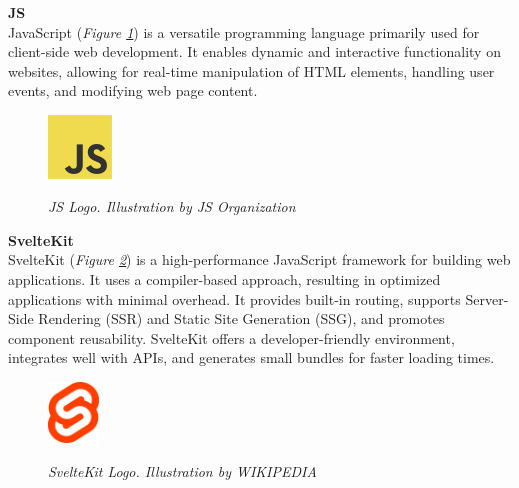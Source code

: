 \vspace{0.5cm}
\textbf{JS} \\

JavaScript (\textit{Figure \ref{fig:js-logo}}) is a versatile programming language primarily used for client-side web development. It enables dynamic and interactive functionality on websites, allowing for real-time manipulation of HTML elements, handling user events, and modifying web page content. 

\begin{figure}[H]
\centering
\begin{adjustbox}{trim=0cm 0cm, clip}
\includegraphics[width=0.15\textwidth]{imatges/studies_and_decisions/js-logo.png}
\end{adjustbox}
\caption[JS Logo]{\textit{JS Logo. Illustration by JS Organization}}
{\label{fig:js-logo}}
\end{figure}

\newpage

\vspace{0.5cm}
\textbf{SvelteKit} \\

SvelteKit (\textit{Figure \ref{fig:sveltekit-logo}}) is a high-performance JavaScript framework for building web applications. It uses a compiler-based approach, resulting in optimized applications with minimal overhead. It provides built-in routing, supports Server-Side Rendering (SSR) and Static Site Generation (SSG), and promotes component reusability. SvelteKit offers a developer-friendly environment, integrates well with APIs, and generates small bundles for faster loading times. 

\begin{figure}[H]
\centering
\begin{adjustbox}{trim=0cm 0cm, clip}
\includegraphics[width=0.12\textwidth]{imatges/studies_and_decisions/sveltekit-logo.png}
\end{adjustbox}
\caption[SvelteKit Logo]{\textit{SvelteKit Logo. Illustration by WIKIPEDIA}}
{\label{fig:sveltekit-logo}}
\end{figure}

